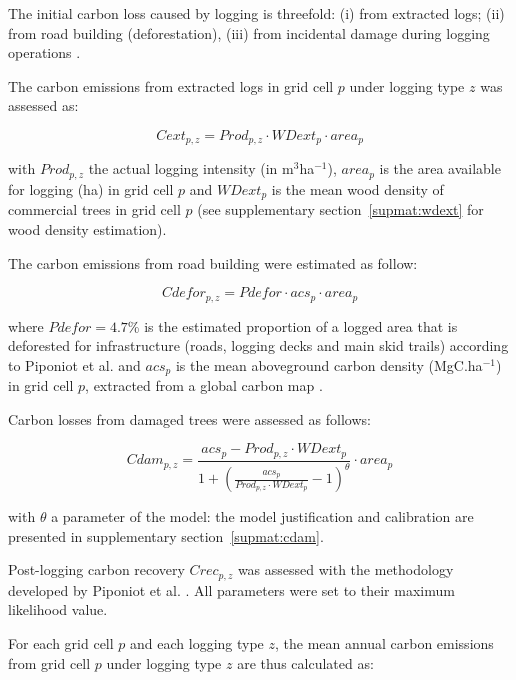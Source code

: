 \documentclass{article}
\begin{document}
The initial carbon loss caused by logging is threefold: (i) from extracted logs; (ii) from road building (deforestation), (iii) from incidental damage during logging operations \cite{Piponiot2016}. 

The carbon emissions from extracted logs in grid cell $p$ under logging type $z$ was assessed as: 

\begin{equation}
\label{eq:cext}
    Cext_{p,z} = Prod_{p,z} \cdot WDext_p \cdot  area_p
\end{equation}

with $Prod_{p,z}$ the actual logging intensity (in m$^3$ha$^{-1}$), $area_p$ is the area available for logging (ha) in grid cell $p$ and $WDext_p$ is the mean wood density of commercial trees in grid cell $p$ (see supplementary section~\ref{supmat:wdext} for wood density estimation). 

The carbon emissions from road building were estimated as follow: 

\begin{equation}
\label{eq:croad}
    Cdefor_{p,z} = Pdefor \cdot acs_p \cdot area_p
\end{equation}

where $Pdefor = 4.7 $\% is the estimated proportion of a logged area that is deforested for infrastructure (roads, logging decks and main skid trails) according to Piponiot et al. \cite{Piponiot2016} and $acs_p$ is the mean aboveground carbon density (MgC.ha$^{-1}$) in grid cell $p$, extracted from a global carbon map \cite{Avitabile2016}. 

Carbon losses from damaged trees were assessed as follows: 

\begin{equation}
\label{eq:cdam}
    Cdam_{p,z} = \frac{acs_p  - Prod_{p,z} \cdot WDext_p } {1 + \left(\frac{acs_p}{Prod_{p,z} \cdot WDext_p}  -1 \right)^\theta} \cdot area_p
\end{equation}

with $\theta$ a parameter of the model: the model justification and calibration are presented in supplementary section~\ref{supmat:cdam}. 

Post-logging carbon recovery $Crec_{p,z}$ was assessed with the methodology developed by Piponiot et al. \cite{Piponiot2016a}.  
All parameters were set to their maximum likelihood value. 

For each grid cell $p$ and each logging type $z$, the mean annual carbon emissions from grid cell $p$ under logging type $z$ are thus calculated as: 
\end{document}
